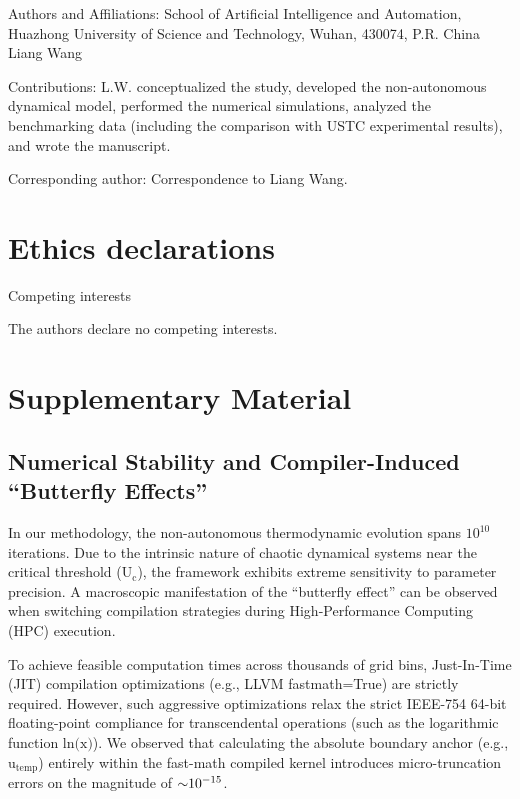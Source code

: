 \documentclass[fleqn,10pt]{wlscirep}
\begin{document}
Authors and Affiliations: School of Artificial Intelligence and
Automation, Huazhong University of Science and Technology, Wuhan,
430074, P.R. China Liang Wang

Contributions: L.W. conceptualized the study, developed the
non-autonomous dynamical model, performed the numerical simulations,
analyzed the benchmarking data (including the comparison with USTC
experimental results), and wrote the manuscript.

Corresponding author: Correspondence to Liang Wang.

\section*{Ethics declarations}

Competing interests

The authors declare no competing interests.

\section*{Supplementary Material}

\subsection*{Numerical Stability and Compiler-Induced ``Butterfly Effects''}

In our methodology, the non-autonomous thermodynamic evolution spans
\(\text{10}^{\text{10}}\) iterations. Due to the intrinsic nature of
chaotic dynamical systems near the critical threshold
(\(\text{U}_{\text{c}}\)), the framework exhibits extreme sensitivity to
parameter precision. A macroscopic manifestation of the ``butterfly
effect'' can be observed when switching compilation strategies during
High-Performance Computing (HPC) execution.

To achieve feasible computation times across thousands of grid bins,
Just-In-Time (JIT) compilation optimizations (e.g., LLVM fastmath=True)
are strictly required. However, such aggressive optimizations relax the
strict IEEE-754 64-bit floating-point compliance for transcendental
operations (such as the logarithmic function
\(\text{ln(}\text{x}\text{)}\)). We observed that calculating the
absolute boundary anchor (e.g., \(\text{u}_{\text{temp}}\)) entirely
within the fast-math compiled kernel introduces micro-truncation errors
on the magnitude of \(\text{\ensuremath{\sim}}\text{10}^{\text{\ensuremath{-}15}}\).
\end{document}
